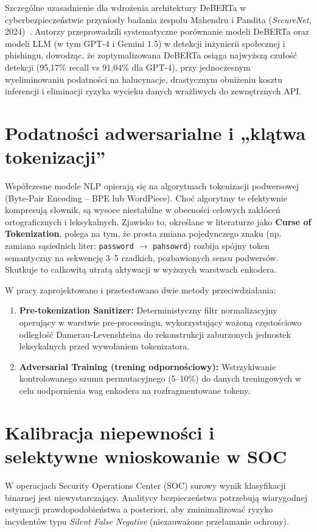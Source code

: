 \documentclass[12pt,a4paper,twoside]{report}
\begin{document}
Szczególne uzasadnienie dla wdrożenia architektury DeBERTa w cyberbezpieczeństwie przyniosły badania zespołu Mahendru i Pandita (\emph{SecureNet}, 2024)~\cite{securenet2024}. Autorzy przeprowadzili systematyczne porównanie modeli DeBERTa oraz modeli LLM (w tym GPT-4 i Gemini 1.5) w detekcji inżynierii społecznej i phishingu, dowodząc, że zoptymalizowana DeBERTa osiąga najwyższą czułość detekcji (95,17\% recall vs 91,04\% dla GPT-4), przy jednoczesnym wyeliminowaniu podatności na halucynacje, drastycznym obniżeniu kosztu inferencji i eliminacji ryzyka wycieku danych wrażliwych do zewnętrznych API.

\section{Podatności adwersarialne i „klątwa tokenizacji”}
Współczesne modele NLP opierają się na algorytmach tokenizacji podwersowej (Byte-Pair Encoding -- BPE lub WordPiece). Choć algorytmy te efektywnie kompresują słownik, są wysoce niestabilne w obecności celowych zakłóceń ortograficznych i leksykalnych. Zjawisko to, określane w literaturze jako \textbf{Curse of Tokenization}, polega na tym, że prosta zmiana pojedynczego znaku (np. zamiana sąsiednich liter: \texttt{password} $\to$ \texttt{pahsowrd}) rozbija spójny token semantyczny na sekwencję 3--5 rzadkich, pozbawionych sensu podwersów. Skutkuje to całkowitą utratą aktywacji w wyższych warstwach enkodera.

W pracy zaprojektowano i przetestowano dwie metody przeciwdziałania:
\begin{enumerate}[leftmargin=*]
  \item \textbf{Pre-tokenization Sanitizer:} Deterministyczny filtr normalizacyjny operujący w warstwie pre-processingu, wykorzystujący ważoną częstościowo odległość Damerau-Levenshteina do rekonstrukcji zaburzonych jednostek leksykalnych przed wywołaniem tokenizatora.
  \item \textbf{Adversarial Training (trening odpornościowy):} Wstrzykiwanie kontrolowanego szumu permutacyjnego (5--10\%) do danych treningowych w celu uodpornienia wag enkodera na rozfragmentowane tokeny.
\end{enumerate}

\section{Kalibracja niepewności i selektywne wnioskowanie w SOC}
W operacjach Security Operations Center (SOC) surowy wynik klasyfikacji binarnej jest niewystarczający. Analitycy bezpieczeństwa potrzebują wiarygodnej estymacji prawdopodobieństwa a posteriori, aby zminimalizować ryzyko incydentów typu \emph{Silent False Negative} (niezauważone przełamanie ochrony).
\end{document}
